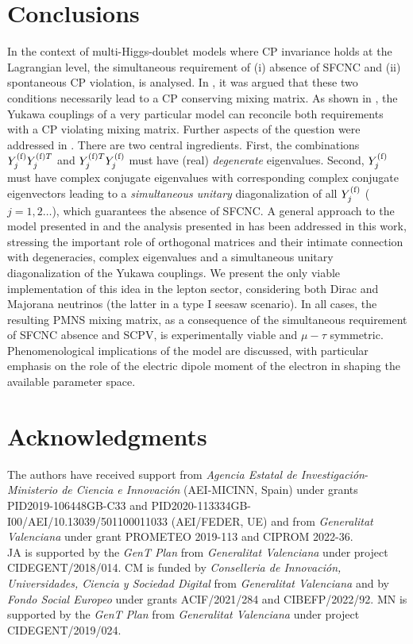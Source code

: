 \documentclass[12pt,a4paper]{article}
\begin{document}
\section{Conclusions\label{SEC:Conc}}
In the context of multi-Higgs-doublet models where CP invariance holds at the Lagrangian level, the simultaneous requirement of (i) absence of SFCNC and (ii) spontaneous CP violation, is analysed. In \cite{Branco:1979pv}, it was argued that these two conditions necessarily lead to a CP conserving mixing matrix. As shown in \cite{Ecker:1987md}, the Yukawa couplings of a very particular model can reconcile both requirements with a CP violating mixing matrix. Further aspects of the question were addressed in \cite{Gronau:1987xz}. There are two central ingredients. First, the combinations $Y_{j}^{\rm (f)}Y_{j}^{{\rm (f)}T}$ and $Y_{j}^{{\rm (f)}T}Y_{j}^{\rm (f)}$ must have (real) \emph{degenerate} eigenvalues. Second, $Y_{j}^{\rm (f)}$ must have complex conjugate eigenvalues with corresponding complex conjugate eigenvectors leading to a \emph{simultaneous unitary} diagonalization of all $Y_{j}^{\rm (f)}$ ($j=1, 2\ldots$), which guarantees the absence of SFCNC. A general approach to the model presented in \cite{Ecker:1987md} and the analysis presented in \cite{Gronau:1987xz} has been addressed in this work, stressing the important role of orthogonal matrices and their intimate connection with degeneracies, complex eigenvalues and a simultaneous unitary diagonalization of the Yukawa couplings. We present the only viable implementation of this idea in the lepton sector, considering both Dirac and Majorana neutrinos (the latter in a type I seesaw scenario). In all cases, the resulting PMNS mixing matrix, as a consequence of the simultaneous requirement of SFCNC absence and SCPV, is experimentally viable and $\mu-\tau$ symmetric. Phenomenological implications of the model are discussed, with particular emphasis on the role of the electric dipole moment of the electron in shaping the available parameter space.


\section*{Acknowledgments\label{SEC:Ack}}
The authors have received support from \textit{Agencia Estatal de Investigaci\'on}-\textit{Ministerio de Ciencia e Innovaci\'on} (AEI-MICINN, Spain) under grants PID2019-106448GB-C33 and PID2020-113334GB-I00/AEI/10.13039/501100011033 (AEI/FEDER, UE) and from \textit{Generalitat Valenciana} under grant PROMETEO 2019-113 and CIPROM 2022-36.\\ JA is supported by the \textit{GenT Plan} from \textit{Generalitat Valenciana} under project CIDEGENT/2018/014. CM is funded by \textit{Conselleria de Innovación, Universidades, Ciencia y Sociedad Digital} from \textit{Generalitat Valenciana} and by \textit{Fondo Social Europeo} under grants ACIF/2021/284 and CIBEFP/2022/92. MN is supported by the \textit{GenT Plan} from \textit{Generalitat Valenciana} under project CIDEGENT/2019/024.
\end{document}
